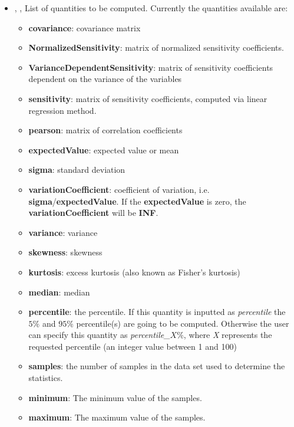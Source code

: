 \begin{itemize}
  \item {}, ,
  List of quantities to be computed.
  Currently the quantities available are:
  \begin{itemize}
    \item \textbf{covariance}: covariance matrix
    \item \textbf{NormalizedSensitivity}: matrix of normalized sensitivity
    coefficients. 
    \item \textbf{VarianceDependentSensitivity}: matrix of sensitivity coefficients dependent on the variance of the variables
    \item \textbf{sensitivity}: matrix of sensitivity coefficients, computed via linear regression method.
    \item \textbf{pearson}: matrix of correlation coefficients
    \item \textbf{expectedValue}: expected value or mean
    \item \textbf{sigma}: standard deviation
    \item \textbf{variationCoefficient}: coefficient of variation, i.e. \textbf{sigma}/\textbf{expectedValue}. \nb If the \textbf{expectedValue} is zero,
    the \textbf{variationCoefficient} will be \textbf{INF}.
    \item \textbf{variance}: variance
    \item \textbf{skewness}: skewness
    \item \textbf{kurtosis}: excess kurtosis (also known as Fisher's kurtosis)
    \item \textbf{median}: median
    \item \textbf{percentile}: the percentile. If this quantity is inputted as \textit{percentile} the $5\%$ and $95\%$ percentile(s) are going to be computed.
                               Otherwise the user can specify this quantity as \textit{percentile\_$X\%$}, where \textit{X} represents the requested
                               percentile (an integer value between 1 and 100)
    \item \textbf{samples}: the number of samples in the data set used to determine the statistics.
    \item \textbf{minimum}: The minimum value of the samples.
    \item \textbf{maximum}: The maximum value of the samples.
  \end{itemize}

\end{itemize}
